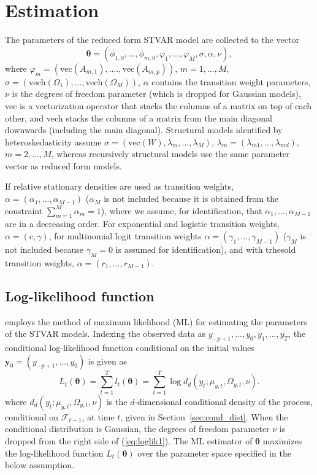 \documentclass[nojss]{jss}
\begin{document}
\section{Estimation}\label{sec:estimation}
The parameters of the reduced form STVAR model are collected to the vector
\begin{equation}\label{eq:paramvector}
\boldsymbol{\theta}=(\phi_{1,0},...,\phi_{m,0},\varphi_1,...,\varphi_M,\sigma,\alpha,\nu),
\end{equation}
where $\varphi_m=(\text{vec}(A_{m,1}),....,\text{vec}(A_{m,p}))$, $m=1,...,M$, $\sigma=(\text{vech}(\Omega_1),...,\text{vech}(\Omega_M))$, $\alpha$ contains the transition weight parameters, $\nu$ is the degrees of freedom parameter (which is dropped for Gaussian models), vec is a vectorization operator that stacks the columns of a matrix on top of each other, and vech stacks the columns of a matrix from the main diagonal downwards (including the main diagonal). Structural models identified by heteroskedasticity assume $\sigma = (\text{vec}(W),\lambda_m,...,\lambda_M)$, $\lambda_m=(\lambda_{m1},...,\lambda_{md})$, $m=2,...,M$, whereas recursively structural models use the same parameter vector as reduced form models.

If relative stationary densities are used as transition weights, $\alpha=(\alpha_1,...,\alpha_{M-1})$ ($\alpha_M$ is not included because it is obtained from the constraint $\sum_{m=1}^M \alpha_m=1$), where we assume, for identification, that $\alpha_1,...,\alpha_{M-1}$ are in a decreasing order. For exponential and logistic transition weights, $\alpha=(c,\gamma)$, for multinomial logit transition weights  $\alpha=(\gamma_1,...,\gamma_{M-1})$ ($\gamma_M$ is not included because $\gamma_M=0$ is assumed for identification), and with trhesold transition weights, $\alpha=(r_1,...,r_{M-1})$.

\subsection{Log-likelihood function}\label{sec:loglik}
 employs the method of maximum likelihood (ML) for estimating the parameters of the STVAR models. Indexing the observed data as $y_{-p+1},...,y_0,y_1,...,y_T$, the conditional log-likelihood function conditional on the initial values $\boldsymbol{y}_0=(y_{-p+1},...,y_0)$ is given as
\begin{equation}\label{eq:loglik1}
L_t(\boldsymbol{\theta})=\sum_{t=1}^T l_t(\boldsymbol{\theta}) = \sum_{t=1}^T \log d_d(y_t;\mu_{y,t},\Omega_{y,t},\nu).
\end{equation}
where $d_d(y_t;\mu_{y,t},\Omega_{y,t},\nu)$ is the $d$-dimensional conditional density of the process, conditional on $\mathcal{F}_{t-1}$, at time $t$, given in Section~\ref{sec:cond_dist}. When the conditional distribution is Gaussian, the degrees of freedom parameter $\nu$ is dropped from the right side of (\ref{eq:loglik1}). The ML estimator of $\boldsymbol{\theta}$ maximizes the log-likelihood function $L_t(\boldsymbol{\theta})$ over the parameter space specified in the below assumption.
\end{document}

